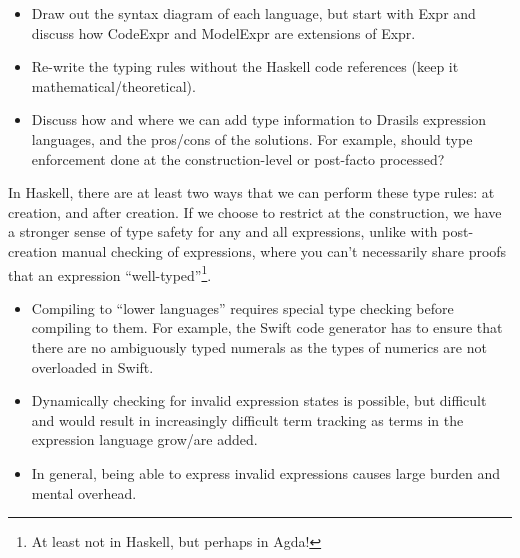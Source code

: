 \begin{itemize}
      \item Draw out the syntax diagram of each language, but start with Expr
            and discuss how CodeExpr and ModelExpr are extensions of Expr.

      \item Re-write the typing rules without the Haskell code references (keep
            it mathematical/theoretical).

      \item Discuss how and where we can add type information to Drasils
            expression languages, and the pros/cons of the solutions. For
            example, should type enforcement done at the construction-level or
            post-facto processed?
\end{itemize}

In Haskell, there are at least two ways that we can perform these type rules: at
creation, and after creation. If we choose to restrict at the construction, we
have a stronger sense of type safety for any and all expressions, unlike with
post-creation manual checking of expressions, where you can't necessarily share
proofs that an expression ``well-typed''\footnote{At least not in Haskell, but
      perhaps in Agda!}.

\begin{itemize}

      \item Compiling to ``lower languages'' requires special type checking
            before compiling to them. For example, the Swift code generator has
            to ensure that there are no ambiguously typed numerals as the types
            of numerics are not overloaded in Swift.

      \item Dynamically checking for invalid expression states is possible, but
            difficult and would result in increasingly difficult term tracking
            as terms in the expression language grow/are added.

      \item In general, being able to express invalid expressions causes large
            burden and mental overhead.

\end{itemize}












